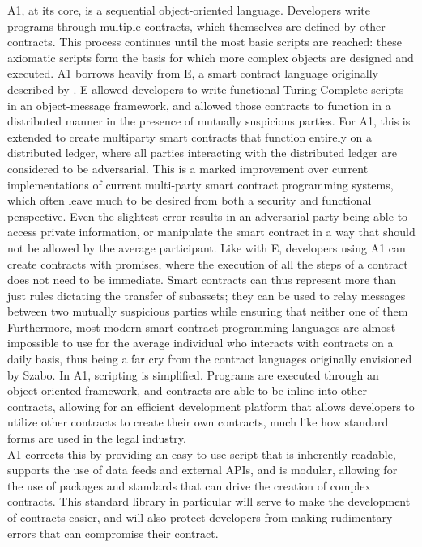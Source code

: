 \documentclass[conference]{IEEEtran}
\begin{document}
A1, at its core, is a sequential object-oriented language. Developers write programs through multiple contracts, which themselves are defined by other contracts. This process continues until the most basic scripts are reached: these axiomatic scripts form the basis for which more complex objects are designed and executed. A1 borrows heavily from E, a smart contract language originally described by \cite{miller1997E}. E allowed developers to write functional Turing-Complete scripts in an object-message framework, and allowed those contracts to function in a distributed manner in the presence of mutually suspicious parties. For A1, this is extended to create multiparty smart contracts that function entirely on a distributed ledger, where all parties interacting with the distributed ledger are considered to be adversarial. This is a marked improvement over current implementations of current multi-party smart contract programming systems,  which often leave much to be desired from both a security and functional perspective. Even the slightest error results in an adversarial party being able to access  private information, or manipulate the smart contract in a way that should not be allowed by the average participant. Like with E, developers using A1 can create contracts with promises, where the execution of all the steps of a contract does not need to be immediate. Smart contracts can thus represent more than just rules dictating the transfer of subassets; they can be used to relay messages between two mutually suspicious parties while ensuring that neither one of them  Furthermore, most modern smart contract programming languages are almost impossible to use for the average individual who interacts with contracts on a daily basis, thus being a far cry from the contract languages originally envisioned by Szabo. In A1, scripting is simplified. Programs are executed through an object-oriented framework, and contracts are able to be inline into other contracts, allowing for an efficient development platform that allows developers to utilize other contracts to create their own contracts, much like how standard forms are used in the legal industry.\\

A1 corrects this by providing an easy-to-use script that is inherently readable, supports the use of data feeds and external APIs, and is modular, allowing for the use of packages and standards that can drive the creation of complex contracts. This standard library in particular will serve to make the development of contracts easier, and will also protect developers from making rudimentary errors that can compromise their contract. 
\end{document}
